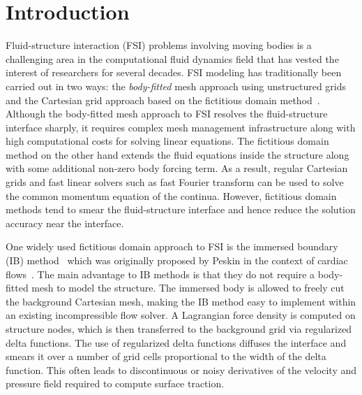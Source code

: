 \documentclass[review]{elsarticle}
\begin{document}

\section{Introduction}

Fluid-structure interaction (FSI) problems involving moving bodies
is a challenging area in the computational fluid dynamics 
field that has vested the interest of researchers for several decades.
FSI modeling has traditionally been carried out in two ways: the 
\emph{body-fitted} mesh approach using unstructured grids~\cite{Hu01,Kern06} 
and the Cartesian grid approach based on the fictitious domain 
method~\cite{RGlowinski99,NAPatankar00}. Although the
body-fitted mesh approach to FSI resolves the fluid-structure interface 
sharply, it requires complex mesh management infrastructure along 
with high computational costs for solving linear equations. The fictitious 
domain method on the other hand extends the fluid equations inside 
the structure along with some additional non-zero body forcing term. 
As a result, regular Cartesian grids and fast linear solvers such as fast Fourier transform
can be used to solve the common momentum equation of the continua. 
However, fictitious domain methods tend to smear the fluid-structure
interface and hence reduce the solution accuracy near the interface.
 
One widely used fictitious domain approach to FSI is the 
immersed boundary (IB) method~\cite{Peskin02} which was 
originally proposed by Peskin in the context of cardiac flows~\cite{Peskin72b}. 
The main advantage to IB methods is that they do not require 
a body-fitted mesh to model the structure. The immersed body 
is allowed to freely cut the background Cartesian mesh, 
making the IB method easy to implement within an existing 
incompressible flow solver. A Lagrangian force density is 
computed on structure nodes, which is then transferred to the 
background grid via regularized delta functions. The use of 
regularized delta functions diffuses the interface and smears 
it over a number of grid cells proportional to the width of the 
delta function. This often leads to discontinuous
or noisy derivatives of the velocity and pressure field required 
to compute surface traction.
\end{document}
